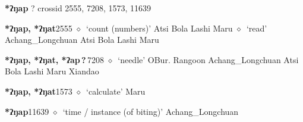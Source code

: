 \item
\textbf{*ʔŋap}
?
  {\tiny crossid 2555, 7208, 1573, 11639}
  \begin{list}{}{\leftmargin=1.5em \itemindent=-1.5em}
  \item {\footnotesize \textbf{*ʔŋap, *ʔŋat}}{\tiny 2555}
         $\diamond$~`count (numbers)'
         Atsi 
\hspace{1ex}
         Bola 
\hspace{1ex}
         Lashi 
\hspace{1ex}
         Maru 
\hspace{1ex}
         $\diamond$~`read'
         Achang\_Longchuan 
\hspace{1ex}
         Atsi 
\hspace{1ex}
         Bola 
\hspace{1ex}
         Lashi 
\hspace{1ex}
         Maru 
  \item {\footnotesize \textbf{*ʔŋap, *ʔŋat, *ʔap\,?\,}}{\tiny 7208}
\hspace{1ex}
         $\diamond$~`needle'
         OBur. 
\hspace{1ex}
         Rangoon 
\hspace{1ex}
         Achang\_Longchuan 
\hspace{1ex}
         Atsi 
\hspace{1ex}
         Bola 
\hspace{1ex}
         Lashi 
\hspace{1ex}
         Maru 
\hspace{1ex}
         Xiandao 
  \item {\footnotesize \textbf{*ʔŋap, *ʔŋat}}{\tiny 1573}
\hspace{1ex}
         $\diamond$~`calculate'
         Maru 
  \item {\footnotesize \textbf{*ʔŋap}}{\tiny 11639}
\hspace{1ex}
         $\diamond$~`time / instance (of biting)'
         Achang\_Longchuan 
  \end{list}
